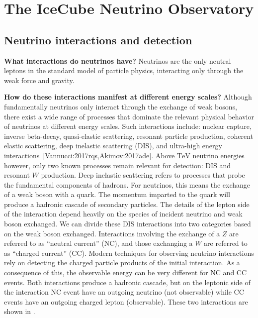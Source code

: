 \chapter{The IceCube Neutrino Observatory}

\section{Neutrino interactions and detection}

\textbf{What interactions do neutrinos have?}
Neutrinos are the only neutral leptons in the standard model of particle physics, interacting only through the weak force and gravity.

\textbf{How do these interactions manifest at different energy scales?}
Although fundamentally neutrinos only interact through the exchange of weak bosons, there exist a wide range of processes that dominate the relevant physical behavior of neutrinos at different energy scales.
Such interactions include: nuclear capture, inverse beta-decay, quasi-elastic scattering, resonant particle production, coherent elastic scattering, deep inelastic scattering (DIS), and ultra-high energy interactions~\ref{Vannucci:2017rqs,Akimov:2017ade}.
Above $\si\TeV$ neutrino energies however, only two known processes remain relevant for detection: DIS and resonant $W$ production.
Deep inelastic scattering refers to processes that probe the fundamental components of hadrons.
For neutrinos, this means the exchange of a weak boson with a quark.
The momentum imparted to the quark will produce a hadronic cascade of secondary particles.
The details of the lepton side of the interaction depend heavily on the species of incident neutrino and weak boson exchanged.
We can divide these DIS interactions into two categories based on the weak boson exchanged.
Interactions involving the exchange of a $Z$ are referred to as ``neutral current'' (NC), and those exchanging a $W$ are referred to as ``charged current'' (CC).
Modern techniques for observing neutrino interactions rely on detecting the charged particle products of the initial interaction.
As a consequence of this, the observable energy can be very different for NC and CC events.
Both interactions produce a hadronic cascade, but on the leptonic side of the interaction NC event have an outgoing neutrino (not observable) while CC events have an outgoing charged lepton (observable).
These two interactions are shown in .

